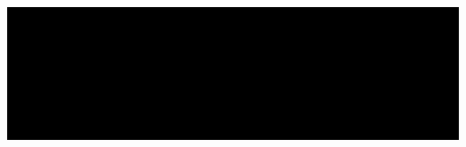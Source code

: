 \documentclass{article}
\newcommand{\lam}{\uplambda}
\newcommand{\ttt}{\text{\texttt{t}}}
\newcommand{\kk}{\text{\texttt{k}}}
\newcommand{\jj}{\text{\texttt{j}}}
\newcommand{\sss}{\text{\texttt{s}}}
\newcommand{\shiftup}{{\uparrow}}
\begin{document}
\Huge
\colorbox{black}{\color{white}
\begin{minipage}{\textwidth}
\vspace{1cm}
\[
\begin{array}{lcl}
\shiftup^d_c(\kk) & = & \left\{ \begin{array}{ll} \kk & \text{if } \kk < c \\ \kk + d & \text{if } \kk \geq c \end{array} \right. \\
\shiftup^d_c(\lam.\ttt_1) &=& \lam. \shiftup^d_{c+1}(\ttt_1) \\
\shiftup^d_c(\ttt_1\ \ttt_2) &=& \shiftup^d_c(\ttt_1)\ \shiftup^d_c(\ttt_2)
\end{array}
\]
\vspace{2cm}
\[
\begin{array}{lcl}
[\jj \mapsto \sss]\kk &=& \left\{ \begin{array}{ll} \sss & \text{if } \kk = \jj \\ \kk & \text{otherwise} \end{array} \right. \\{}
[\jj \mapsto \sss](\lam.\ttt_1) &=& \lam.[\jj+1 \mapsto \shiftup^1_0(\sss)]\ttt_1 \\{}
[\jj \mapsto \sss](\ttt_1\ \ttt_2) &=& [\jj \mapsto \sss]\ttt_1\ [\jj \mapsto \sss]\ttt_2
\end{array}
\]
\vspace{1cm}
\end{minipage}
}
\end{document}
